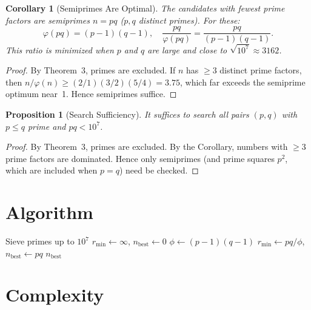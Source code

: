 \documentclass[12pt,a4paper]{article}
\newtheorem{corollary}[theorem]{Corollary}
\newtheorem{proposition}[theorem]{Proposition}
\begin{document}
\begin{corollary}[Semiprimes Are Optimal]
The candidates with fewest prime factors are semiprimes $n = pq$ ($p, q$ distinct primes). For these:
\[
\varphi(pq) = (p-1)(q-1), \quad \frac{pq}{\varphi(pq)} = \frac{pq}{(p-1)(q-1)}.
\]
This ratio is minimized when $p$ and $q$ are large and close to $\sqrt{10^7} \approx 3162$.
\end{corollary}

\begin{proof}
By Theorem~3, primes are excluded. If $n$ has $\geq 3$ distinct prime factors, then $n/\varphi(n) \geq (2/1)(3/2)(5/4) = 3.75$, which far exceeds the semiprime optimum near~1. Hence semiprimes suffice.
\end{proof}

\begin{proposition}[Search Sufficiency]
It suffices to search all pairs $(p,q)$ with $p \leq q$ prime and $pq < 10^7$.
\end{proposition}

\begin{proof}
By Theorem~3, primes are excluded. By the Corollary, numbers with $\geq 3$ prime factors are dominated. Hence only semiprimes (and prime squares $p^2$, which are included when $p = q$) need be checked.
\end{proof}

\section{Algorithm}

\begin{algorithm}[H]
\caption{Find $n < 10^7$ minimizing $n/\varphi(n)$ with $\varphi(n)$ a digit permutation of $n$}
\begin{algorithmic}[1]
\State Sieve primes up to $10^7$
\State $r_{\min} \gets \infty$, $n_{\text{best}} \gets 0$
        \State $\phi \gets (p-1)(q-1)$
            \State $r_{\min} \gets pq / \phi$, $n_{\text{best}} \gets pq$
        \EndIf
    \EndFor
\EndFor
\State \Return $n_{\text{best}}$
\end{algorithmic}
\end{algorithm}

\section{Complexity}
\end{document}
